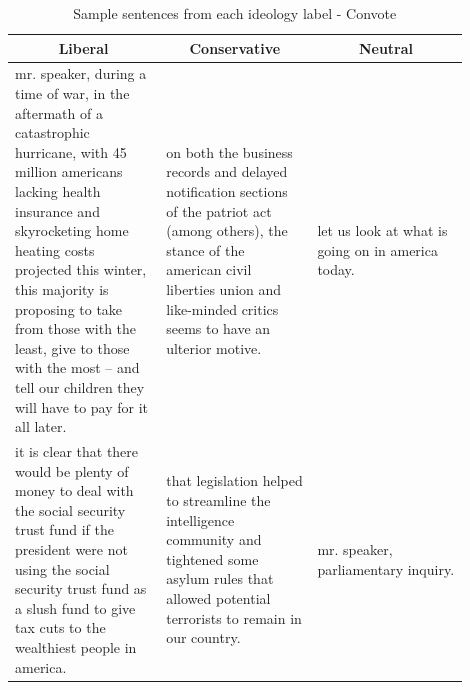 \documentclass[10pt,a4paper,onecolumn]{article}
\begin{document}
\begin{table}[h!]
	\begin{center}
		\caption{Sample sentences from each ideology label - Convote}
		\label{tab:convote-sentences}
		\begin{tabular}{p{0.3\linewidth}|p{0.3\linewidth}|p{0.3\linewidth}}
			\hline\hline
			\multicolumn{1}{c|}{\textbf{Liberal}} & \multicolumn{1}{c|}{\textbf{Conservative}} & \multicolumn{1}{c|}{\textbf{Neutral}}\\
			\hline
			mr. speaker, during a time of war, in the aftermath of a catastrophic hurricane, with 45 million americans lacking health insurance and skyrocketing home heating costs projected this winter, this majority is proposing to take from those with the least, give to those with the most -- and tell our children they will have to pay for it all later. & on both the business records and delayed notification sections of the patriot act (among others), the stance of the american civil liberties union and like-minded critics seems to have an ulterior motive. & let us look at what is going on in america today. \\
			it is clear that there would be plenty of money to deal with the social security trust fund if the president were not using the social security trust fund as a slush fund to give tax cuts to the wealthiest people in america. & that legislation helped to streamline the intelligence community and tightened some asylum rules that allowed potential terrorists to remain in our country. & mr. speaker, parliamentary inquiry. \\
			\hline\hline
		\end{tabular}
	\end{center}
\end{table}
\end{document}
